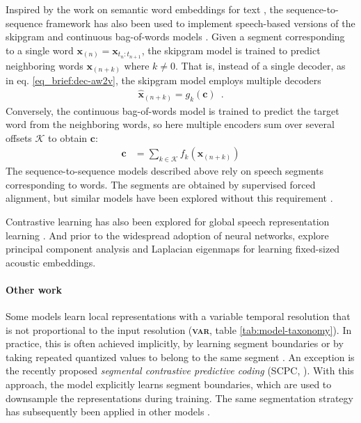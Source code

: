 {Inspired by the work on semantic word embeddings for text \cite{mikolov_distributed_2013}, the sequence-to-sequence framework has also been used to implement speech-based versions of the skipgram and continuous bag-of-words models \cite{chung_learning_2017, chung_speech2vec_2018}. Given a segment corresponding to a single word $\mathbf{x}_{(n)} = \mathbf{x}_{t_{n}:t_{n+1}}$, the skipgram model is trained to predict neighboring words $\mathbf{x}_{(n + k)}$ where $k\ne0$. That is, instead of a single decoder, as in eq. \ref{eq_brief:dec-aw2v}, the skipgram model employs multiple decoders
%
\begin{align}
    \hat{\mathbf{x}}_{(n + k)} = g_k(\mathbf{c})\enspace.
\end{align}
%
Conversely, the continuous bag-of-words model is trained to predict the target word from the neighboring words, so here multiple encoders sum over several offsets $\mathcal{K}$ to obtain $\mathbf{c}$:
%
\begin{align}
    \mathbf{c} &= \sum_{k\in\mathcal{K}} f_k(\mathbf{x}_{(n + k)}) %
\end{align}
The sequence-to-sequence models described above rely on speech segments corresponding to words. The segments are obtained by supervised forced alignment, but similar models have been explored without this requirement \cite{jati_speaker2vec_2017, tagliasacchi_pretraining_2020}.

Contrastive learning has also been explored for global speech representation learning \citep{milde_unspeech_2018, jati_neural_2019, jansen_unsupervised_2018}. And prior to the widespread adoption of neural networks, \citet{levin_fixeddimensional_2013} explore principal component analysis and Laplacian eigenmaps for learning fixed-sized acoustic embeddings.

\paragraph{Other work}
Some models learn local representations with a variable temporal resolution that is not proportional to the input resolution (\textbf{\textsc{var}}, table \ref{tab:model-taxonomy}). In practice, this is often achieved implicitly, by learning segment boundaries or by taking repeated quantized values to belong to the same segment \cite{kamper_unsupervised_2021, chorowski_unsupervised_2019, michel_blind_2017, kreuk_selfsupervised_2020, wang_gate_2017, dieleman_variablerate_2021}. An exception is the recently proposed \emph{segmental contrastive predictive coding} (SCPC, \citealp{bhati_segmental_2021, bhati_unsupervised_2022}). With this approach, the model explicitly learns segment boundaries, which are used to downsample the representations during training. The same segmentation strategy has subsequently been applied in other models \cite{cuervo_contrastive_2022}.

}
